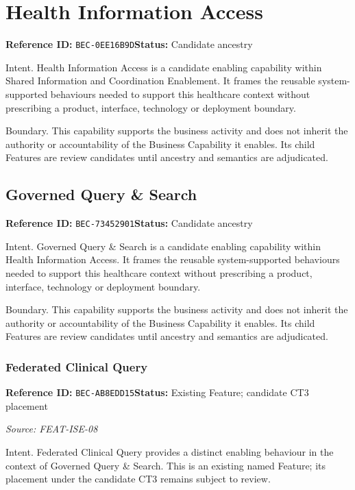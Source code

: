 \documentclass[11pt,a4paper,openany]{book}
\begin{document}
\section{Health Information Access}\label{cap:bec-0ee16b9d}
\noindent\textbf{Reference ID:} \texttt{BEC-0EE16B9D}\quad \textbf{Status:} Candidate ancestry\par
Intent. Health Information Access is a candidate enabling capability within Shared Information and Coordination Enablement. It frames the reusable system-supported behaviours needed to support this healthcare context without prescribing a product, interface, technology or deployment boundary.

Boundary. This capability supports the business activity and does not inherit the authority or accountability of the Business Capability it enables. Its child Features are review candidates until ancestry and semantics are adjudicated.

\subsection{Governed Query \& Search}\label{cap:bec-73452901}
\noindent\textbf{Reference ID:} \texttt{BEC-73452901}\quad \textbf{Status:} Candidate ancestry\par
Intent. Governed Query \& Search is a candidate enabling capability within Health Information Access. It frames the reusable system-supported behaviours needed to support this healthcare context without prescribing a product, interface, technology or deployment boundary.

Boundary. This capability supports the business activity and does not inherit the authority or accountability of the Business Capability it enables. Its child Features are review candidates until ancestry and semantics are adjudicated.

\subsubsection{Federated Clinical Query}\label{cap:bec-ab8edd15}
\noindent\textbf{Reference ID:} \texttt{BEC-AB8EDD15}\quad \textbf{Status:} Existing Feature; candidate CT3 placement\par
\noindent\textit{Source: FEAT-ISE-08}\par
Intent. Federated Clinical Query provides a distinct enabling behaviour in the context of Governed Query \& Search. This is an existing named Feature; its placement under the candidate CT3 remains subject to review.
\end{document}
